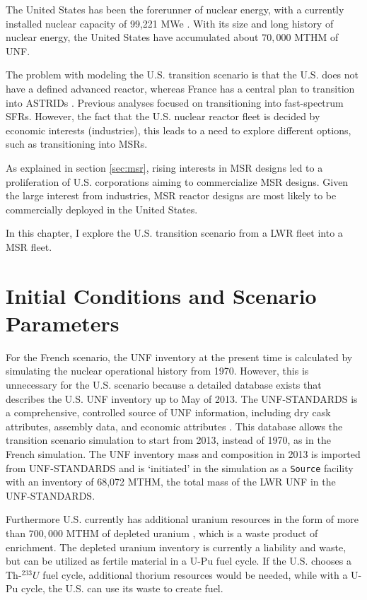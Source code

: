 
The United States has been the forerunner of nuclear energy, with a currently 
installed nuclear capacity of 99,221 \gls{MWe} \cite{iaea_nuclear_2017}.
With its size and long history of nuclear
energy, the United States have accumulated about $70,000$ \gls{MTHM} of \gls{UNF}.

The problem with modeling the U.S. transition scenario is that the U.S. does not have
a defined advanced reactor, whereas France has a central plan to transition into \glspl{ASTRID} \cite{boullis_french_2015, varaine_pre-conceptual_2012}.
Previous analyses \cite{worrall_utilization_2013, sunny_transition_2015} focused on transitioning into
fast-spectrum \glspl{SFR}.
However, the fact that the U.S. nuclear reactor fleet
is decided by economic interests (industries), this leads to
a need to explore different options, such as transitioning into \glspl{MSR}.

As explained in section \ref{sec:msr}, rising interests in \gls{MSR} designs
led to a proliferation of U.S. corporations aiming to commercialize
\gls{MSR} designs. Given the large interest from industries,
\gls{MSR} reactor designs are
most likely to be commercially deployed in the United States.

In this chapter, I explore the U.S. transition scenario
from a \gls{LWR} fleet into a \gls{MSR} fleet.

\section{Initial Conditions and Scenario Parameters}

For the French scenario, the \gls{UNF} inventory at the present
time is calculated by simulating the nuclear operational history from 1970.
However, this is unnecessary for the U.S. scenario because a detailed
database exists that describes the U.S. \gls{UNF} inventory up to May of 2013.
The \gls{UNF-STANDARDS} is a comprehensive,
controlled source of \gls{UNF} information, including dry cask attributes, assembly
data, and economic attributes \cite{peterson_unf-st&dards_2017}. This database
allows the transition scenario simulation to start from 2013, instead of 1970,
as in the French simulation. The \gls{UNF} inventory mass and composition in 2013
is imported from \gls{UNF-STANDARDS} and is `initiated' in the simulation
as a \texttt{Source} facility with an inventory of 68,072 MTHM,
the total mass of the \gls{LWR} \gls{UNF} in the \gls{UNF-STANDARDS}.

Furthermore U.S. currently has additional uranium resources in the
form of more than $700,000$ MTHM of depleted uranium \cite{office_nuclear_2011},
which is a waste product of enrichment. The depleted uranium inventory
is currently a liability and waste, but can be utilized as fertile material
in a U-Pu fuel cycle. If the U.S. chooses a Th-$^233U$ fuel cycle,
additional thorium resources would be needed, while with a U-Pu cycle, the
U.S. can use its waste to create fuel.

